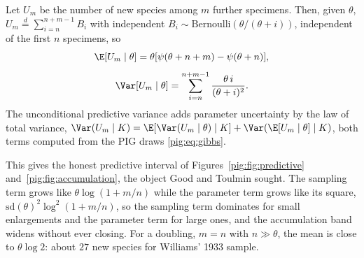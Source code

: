\begin{proposition}\label{pig:prop:newspecies}
Let $U_m$ be the number of new species among $m$ further specimens. Then, given $\theta$, $U_m\overset{d}{=}\sum_{i=n}^{n+m-1}B_i$ with independent $B_i\sim\mathrm{Bernoulli}(\theta/(\theta+i))$, independent of the first $n$ specimens, so
\[
\E[U_m\mid\theta]=\theta[\psi(\theta+n+m)-\psi(\theta+n)],\]
\[\Var[U_m\mid\theta]=\sum_{i=n}^{n+m-1}\frac{\theta\,i}{(\theta+i)^2}.
\]
The unconditional predictive variance adds parameter uncertainty by the law of total variance, $\Var(U_m\mid K)=\E[\Var(U_m\mid\theta)\mid K]+\Var(\E[U_m\mid\theta]\mid K)$, both terms computed from the PIG draws \eqref{pig:eq:gibbs}.
\end{proposition}

This gives the honest predictive interval of Figures~\ref{pig:fig:predictive} and~\ref{pig:fig:accumulation}, the object Good and Toulmin sought. The sampling term grows like $\theta\log(1+m/n)$ while the parameter term grows like its square, $\mathrm{sd}(\theta)^2\log^2(1+m/n)$, so the sampling term dominates for small enlargements and the parameter term for large ones, and the accumulation band widens without ever closing. For a doubling, $m=n$ with $n\gg\theta$, the mean is close to $\theta\log2$: about $27$ new species for Williams' 1933 sample.

